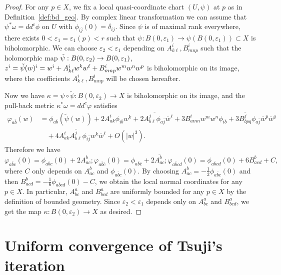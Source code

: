 \documentclass[a4paper, 11pt]{amsart}
\theoremstyle{plain}
\numberwithin{equation}{section} %
\numberwithin{figure}{section} %
\theoremstyle{plain}
\theoremstyle{plain}
\theoremstyle{plain}
\theoremstyle{plain}
\theoremstyle{remark}
\theoremstyle{definition}
\theoremstyle{definition}
\begin{document}
\begin{proof} 
For any $p\in X$, we fix a local quasi-coordinate chart $(U,\psi)$ at $p$  as in Definition~\ref{def:bd_geo}.  By complex linear transformation we can assume that $\psi^*\omega =dd^c \phi$ on $U$ with $\phi_{i \bar j}(0)=\delta_{ij}$.  Since $\psi$ is of maximal rank everywhere, there exists $0<\varepsilon_1=\varepsilon_1(p)<r$ such that $\psi: B(0, \varepsilon_1)\rightarrow 
\psi(B(0, \varepsilon_1))\subset X$ is biholomorphic.  We can choose $\varepsilon_2<\varepsilon_1$ depending on $A^i_{k\ell}, B^i_{mnp} $  such that the holomorphic map  $\Tilde{\psi}: B(0,\varepsilon_2) \rightarrow B(0,\varepsilon_1) $,  $z^i= \Tilde\psi(w)^i= w^i+ A^i_{k\ell}w^kw^\ell + B^i_{mnp} w^m w^n w^p$   is biholomorphic on its image, where  the coefficients $A^i_{k\ell},B^i_{mnp} $  will be chosen hereafter. 

\medskip
Now we have  $\kappa=\psi\circ \tilde\psi:B(0,\varepsilon_2)\rightarrow X$ is biholomorphic on its image,  and the pull-back metric $ \kappa^*\omega =dd^c \varphi$  satisfies
\begin{align*}
   \varphi_{a\bar b} (w)&=\phi_{a\bar b}(\tilde \psi(w)) + 2A^i_{a k}\phi_{i\bar b}w^{k}  + 2\overline{A^j_{b\ell}\phi_{a\bar j}}\overline{w}^\ell + 3B^i_{amn}w^m w^n  \phi_{i\bar b} + 3 \overline{B^j_{bpq}}\phi_{a\bar j}\overline{w}^p\overline{w}^q \\
   &\quad + 4 A^{i}_{a k}\overline{A^j_{b\ell}}\phi_{i\bar j}w^k\overline{w}^\ell+O(|w|^3). 
\end{align*}
Therefore we have
$$
\varphi_{a\bar b c}(0) = \phi_{a\bar b c}(0)+ 2 A^{b}_{ac};  \varphi_{a\bar b \bar c}(0) = \phi_{a\bar b \bar c}+ 2 \overline{ A^{b}_{ac}}; \varphi_{a\bar b cd}(0) = \phi_{a\bar b c d}(0) +6 B^{b}_{acd}+C,
$$
where $C$ only depends on $A^{b}_{ac}$ and $\phi_{a\bar b c}(0)$.
By choosing $A^b_{ac}=-\frac{1}{2}\phi_{a\bar b c}(0)$ and then $B^b_{acd}=-\frac{1}{6}\phi_{a\bar b c d}(0) - C$,  we obtain the local normal coordinates for any $p\in X$. In particular, $A^{a}_{bc}$ and $B^a_{bcd}$ are uniformly bounded for any $p\in X$ by the  definition of bounded geometry. Since $\varepsilon_2<\varepsilon_1$ depends only on $A^{a}_{bc}$ and $B^a_{bcd}$,  we get the map $\kappa: B(0,\varepsilon_2)\rightarrow X$ as desired.
\end{proof}





\section{Uniform convergence of Tsuji’s iteration}\label{sect: main thm}
\end{document}
